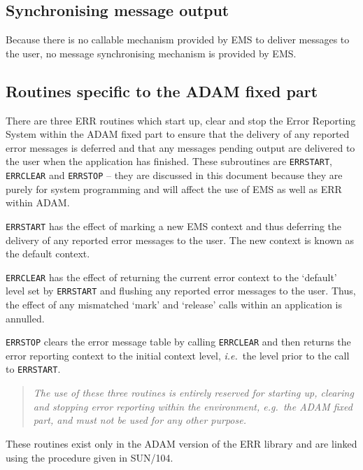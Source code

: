 \documentclass[twoside,11pt]{article}
\newcommand{\xref}[3]{#1}
\newcommand{\xlabel}[1]{}
\renewcommand{\_}{\texttt{\symbol{95}}}
\begin{document}
\subsection{\xlabel{synchronising_message_output}Synchronising message output}
Because there is no callable mechanism provided by EMS to deliver messages to
the user, no message synchronising mechanism is provided by EMS.

\subsection{\xlabel{routines_specific_to_the_adam_fixed_part}Routines specific
to the ADAM fixed part}
There are three ERR routines which start up, clear and stop the Error Reporting
System within the ADAM fixed part to ensure that the delivery of any 
reported error messages is deferred and that any messages pending output are 
delivered to the user when the application has finished.
These subroutines are \texttt{ERR\_START}, \texttt{ERR\_CLEAR} and
\texttt{ERR\_STOP} -- they are
discussed in this document because they are purely for system programming and
will affect the use of EMS as well as ERR within ADAM.

\texttt{ERR\_START} has the effect of marking a new EMS context and thus
deferring the delivery of any reported error messages to the user.
The new context is known as the default context.

\texttt{ERR\_CLEAR} has the effect of returning the current error context to
the `default' level set by \texttt{ERR\_START} and flushing any reported error
messages to the user.
Thus, the effect of any mismatched `mark' and `release' calls within an
application is annulled.

\texttt{ERR\_STOP} clears the error message table by calling
\texttt{ERR\_CLEAR} and then returns
the error reporting context to the initial context level, \textit{i.e.}\ the
level prior to the call to \texttt{ERR\_START}.

\begin {quote}
\emph{The use of these three routines is entirely reserved for starting up, 
clearing and 
stopping error reporting within the environment, \textit{e.g.}\ the ADAM fixed 
part, and must not be used for any other purpose.}
\end {quote}

These routines exist only in the ADAM version of the ERR library and are linked
using the procedure given in 
\xref{SUN/104}{sun104}{compiling_and_linking_with_msg_and_err}.
\end{document}
